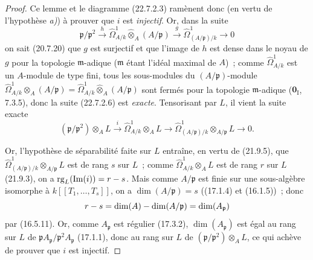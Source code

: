 \begin{proof}
Ce lemme et le diagramme (22.7.2.3) ramènent donc (en vertu de l'hypothèse \emph{a)})
à prouver que $i$ est \emph{injectif}. Or, dans la suite
\begin{equation}
\label{0.22.7.2.6-fr}
  \mathfrak p/\mathfrak p^2\xrightarrow{h}
  \widehat\Omega^1_{A/k}\widehat\otimes_A(A/\mathfrak p)
  \xrightarrow{g}\widehat\Omega^1_{(A/\mathfrak p)/k}\longrightarrow0
  \tag{22.7.2.6}
\end{equation}
on sait (20.7.20) que $g$ est surjectif et que l'image de $h$ est dense dans
le noyau de $g$ pour la topologie $\mathfrak m$-adique ($\mathfrak m$ étant
l'idéal maximal de $A$)~; comme $\widehat\Omega^1_{A/k}$ est un $A$-module de
type fini, tous les sous-modules du $(A/\mathfrak p)$-module
$\widehat\Omega^1_{A/k}\otimes_A(A/\mathfrak p)
=\widehat\Omega^1_{A/k}\widehat\otimes_A(A/\mathfrak p)$
sont fermés pour la topologie $\mathfrak m$-adique ($\mathbf{0}_{\mathrm I}$, 7.3.5),
donc la suite (22.7.2.6) est \emph{exacte}. Tensorisant par $L$, il vient la suite
exacte
\[
  (\mathfrak p/\mathfrak p^2)\otimes_AL\xrightarrow{i}
  \widehat\Omega^1_{A/k}\otimes_AL\longrightarrow
  \widehat\Omega^1_{(A/\mathfrak p)/k}\otimes_{A/\mathfrak p}L
  \longrightarrow0.
\]

Or, l'hypothèse de séparabilité faite sur $L$ entraîne, en vertu de (21.9.5),
que $\widehat\Omega^1_{(A/\mathfrak p)/k}\otimes_{A/\mathfrak p}L$ est de
rang $s$ sur $L$~; comme $\widehat\Omega^1_{A/k}\otimes_AL$ est de rang $r$
sur $L$ (21.9.3), on a $\operatorname{rg}_L(\operatorname{Im}(i))=r- s$. Mais comme
$A/\mathfrak p$ est finie sur une sous-algèbre isomorphe à
$k[[T_1,\ldots,T_s]]$, on a $\dim(A/\mathfrak p)=s$ ((17.1.4) et (16.1.5))~;
donc
\[
  r- s=\dim(A)-\dim(A/\mathfrak p)=\dim(A_{\mathfrak p})
\]
par (16.5.11). Or, comme $A_{\mathfrak p}$ est régulier (17.3.2),
$\dim(A_{\mathfrak p})$ est égal au rang sur $L$ de
$\mathfrak pA_{\mathfrak p}/\mathfrak p^2A_{\mathfrak p}$ (17.1.1), donc au
rang sur $L$ de $(\mathfrak p/\mathfrak p^2)\otimes_AL$, ce qui achève de
prouver que $i$ est injectif.
\end{proof}

